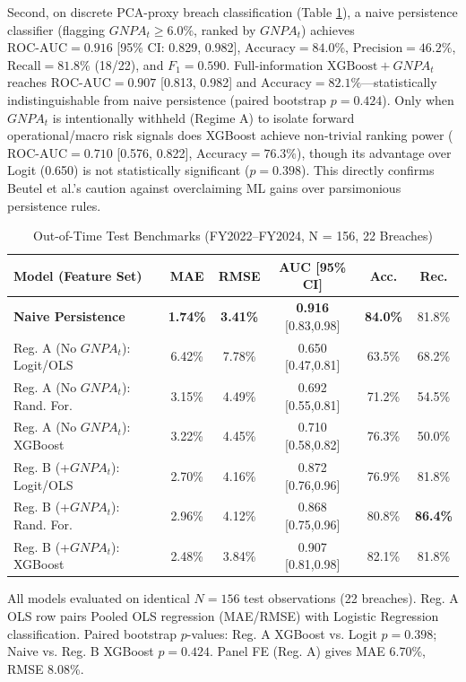 \documentclass[conference]{IEEEtran}
\begin{document}
Second, on discrete PCA-proxy breach classification (Table \ref{tab:benchmarks}), a naive persistence classifier (flagging $GNPA_t \ge 6.0\%$, ranked by $GNPA_t$) achieves $\text{ROC-AUC} = 0.916$ [95\% CI: 0.829, 0.982], $\text{Accuracy} = 84.0\%$, $\text{Precision} = 46.2\%$, $\text{Recall} = 81.8\%$ (18/22), and $F_1 = 0.590$. Full-information $\text{XGBoost}+GNPA_t$ reaches $\text{ROC-AUC} = 0.907$ [0.813, 0.982] and $\text{Accuracy} = 82.1\%$---statistically indistinguishable from naive persistence (paired bootstrap $p = 0.424$). Only when $GNPA_t$ is intentionally withheld (Regime A) to isolate forward operational/macro risk signals does XGBoost achieve non-trivial ranking power ($\text{ROC-AUC} = 0.710$ [0.576, 0.822], $\text{Accuracy} = 76.3\%$), though its advantage over Logit (0.650) is not statistically significant ($p = 0.398$). This directly confirms Beutel et al.'s \cite{beutel2019} caution against overclaiming ML gains over parsimonious persistence rules.

\begin{table}[htbp]
\caption{Out-of-Time Test Benchmarks (FY2022--FY2024, N = 156, 22 Breaches)}
\begin{center}
\begin{tabular}{lccccc}
\toprule
\textbf{Model (Feature Set)} & \textbf{MAE} & \textbf{RMSE} & \textbf{AUC [95\% CI]} & \textbf{Acc.} & \textbf{Rec.} \\
\midrule
\textbf{Naive Persistence} & \textbf{1.74\%} & \textbf{3.41\%} & \textbf{0.916} [0.83,0.98] & \textbf{84.0\%} & 81.8\% \\
Reg. A (No $GNPA_t$): Logit/OLS & 6.42\% & 7.78\% & 0.650 [0.47,0.81] & 63.5\% & 68.2\% \\
Reg. A (No $GNPA_t$): Rand. For. & 3.15\% & 4.49\% & 0.692 [0.55,0.81] & 71.2\% & 54.5\% \\
Reg. A (No $GNPA_t$): XGBoost & 3.22\% & 4.45\% & 0.710 [0.58,0.82] & 76.3\% & 50.0\% \\
Reg. B (+$GNPA_t$): Logit/OLS & 2.70\% & 4.16\% & 0.872 [0.76,0.96] & 76.9\% & 81.8\% \\
Reg. B (+$GNPA_t$): Rand. For. & 2.96\% & 4.12\% & 0.868 [0.75,0.96] & 80.8\% & \textbf{86.4\%} \\
Reg. B (+$GNPA_t$): XGBoost & 2.48\% & 3.84\% & 0.907 [0.81,0.98] & 82.1\% & 81.8\% \\
\bottomrule
\end{tabular}
\end{center}
\vspace{-1mm}
\footnotesize{All models evaluated on identical $N = 156$ test observations (22 breaches). Reg. A OLS row pairs Pooled OLS regression (MAE/RMSE) with Logistic Regression classification. Paired bootstrap $p$-values: Reg. A XGBoost vs. Logit $p = 0.398$; Naive vs. Reg. B XGBoost $p = 0.424$. Panel FE (Reg. A) gives MAE 6.70\%, RMSE 8.08\%.}
\label{tab:benchmarks}
\end{table}
\end{document}
